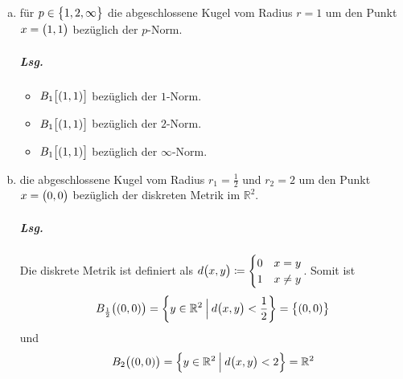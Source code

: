 \documentclass{scrreprt}
\begin{document}
\begin{enumerate}[(a)]
\item für $p \in \qty\big{1, 2, \infty}$ die abgeschlossene Kugel vom Radius
  $r = 1$ um den Punkt $x = \qty\big(1, 1)$ bezüglich der $p$-Norm.

  \subparagraph{Lsg.}
  \begin{itemize}
  \item {\color{black!30!orange} $B_1\qty\big[(1, 1)]$ bezüglich der $1$-Norm.}
  \item {\color{black!30!green} $B_1\qty\big[(1, 1)]$ bezüglich der $2$-Norm.}
  \item {\color{black!30!blue!80} $B_1\qty\big[(1, 1)]$ bezüglich der $\infty$-Norm.}
  \end{itemize}

\item die abgeschlossene Kugel vom Radius $r_1 = \frac{1}{2}$ und $r_2 = 2$
  um den Punkt $x = \qty\big(0, 0)$ bezüglich der diskreten Metrik im
  $\mathbb{R}^2$.

  \subparagraph{Lsg.} Die diskrete Metrik ist definiert als
  $d\qty\big(x, y) \coloneqq \begin{cases}
    0 & x = y \\
    1 & x \ne y
  \end{cases}$.
  Somit ist
  \[
    B_{\frac{1}{2}}\qty\big((0, 0))
    = \qty{y \in \mathbb{R}^2 \: {\Big |} \: d\qty\big(x, y) < \frac{1}{2}}
    = \qty\big{\qty(0, 0)}
  \]
  und
  \[
    B_2\qty\big((0, 0))
    = \qty{y \in \mathbb{R}^2 \: {\Big |} \: d\qty\big(x, y) < 2}
    = \mathbb{R}^2
  \]
\end{enumerate}
\end{document}

